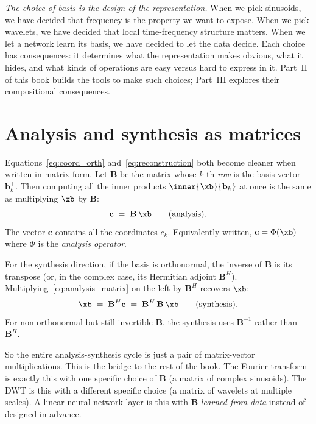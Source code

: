 \emph{The choice of basis is the design of the representation.}  When we
pick sinusoids, we have decided that frequency is the property we want
to expose.  When we pick wavelets, we have decided that local
time-frequency structure matters.  When we let a network learn its
basis, we have decided to let the data decide.  Each choice has
consequences: it determines what the representation makes obvious, what
it hides, and what kinds of operations are easy versus hard to express
in it.  Part~\textsc{II} of this book builds the tools to make such
choices; Part~\textsc{III} explores their compositional consequences.

\section{Analysis and synthesis as matrices}

Equations~\eqref{eq:coord_orth} and~\eqref{eq:reconstruction} both
become cleaner when written in matrix form.  Let $\mathbf{B}$ be the
matrix whose $k$-th \emph{row} is the basis vector $\mathbf{b}_k^\top$.
Then computing all the inner products $\inner{\xb}{\mathbf{b}_k}$ at
once is the same as multiplying $\xb$ by $\mathbf{B}$:
\begin{equation}
    \mathbf{c} \;=\; \mathbf{B}\, \xb \qquad \text{(analysis)}.
    \label{eq:analysis_matrix}
\end{equation}
The vector $\mathbf{c}$ contains all the coordinates $c_k$.  Equivalently
written, $\mathbf{c} = \Phi(\xb)$ where $\Phi$ is the \emph{analysis
operator}.

For the synthesis direction, if the basis is orthonormal, the inverse of
$\mathbf{B}$ is its transpose (or, in the complex case, its Hermitian
adjoint $\mathbf{B}^H$).  Multiplying~\eqref{eq:analysis_matrix} on the
left by $\mathbf{B}^H$ recovers $\xb$:
\begin{equation}
    \xb \;=\; \mathbf{B}^H \mathbf{c} \;=\; \mathbf{B}^H\, \mathbf{B}\, \xb
    \qquad \text{(synthesis)}.
    \label{eq:synthesis_matrix}
\end{equation}
For non-orthonormal but still invertible $\mathbf{B}$, the synthesis
uses $\mathbf{B}^{-1}$ rather than $\mathbf{B}^H$.

So the entire analysis-synthesis cycle is just a pair of matrix-vector
multiplications.  This is the bridge to the rest of the book.  The
Fourier transform is exactly this with one specific choice of
$\mathbf{B}$ (a matrix of complex sinusoids).  The DWT is this with a
different specific choice (a matrix of wavelets at multiple scales).  A
linear neural-network layer is this with $\mathbf{B}$ \emph{learned from
data} instead of designed in advance.

